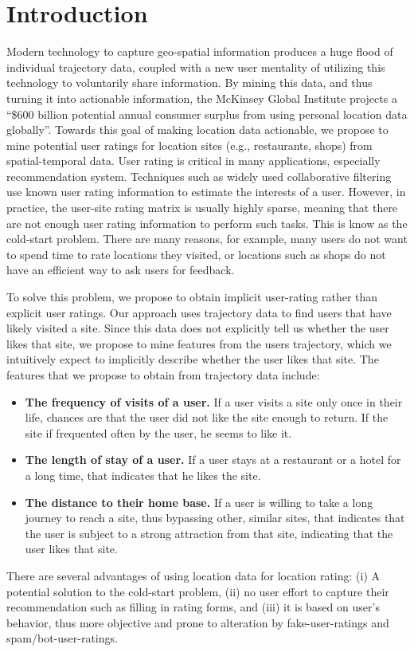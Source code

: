 \section{Introduction}\label{sec:intro}
Modern technology to capture geo-spatial information produces a
huge flood of individual trajectory data, coupled with a new
user mentality of utilizing this technology to voluntarily share information. 
By mining this data, and thus
turning it into actionable information, the McKinsey Global Institute \cite{manyika2011big} projects a ``\$600 billion
potential annual consumer surplus from using personal location data globally''. 
Towards this goal of making location data actionable, we propose to mine potential user ratings for location sites (e.g., restaurants, shops) from spatial-temporal data. User rating is critical in many applications, especially recommendation system. Techniques such as widely used collaborative filtering use known user rating information to estimate the interests of a user. However, in practice, the user-site rating matrix is usually highly sparse, meaning that there are not enough user rating information to perform such tasks. This is know as the cold-start problem. There are many reasons, for example, many users do not want to spend time to rate locations they visited, or locations such as shops do not have an efficient way to ask users for feedback.

To solve this problem, we propose to obtain implicit user-rating rather than explicit user ratings. Our approach uses trajectory data to find users that have likely visited a site. Since this data does not explicitly tell us whether the user likes that site, we propose to mine features from the users trajectory, which we intuitively expect to implicitly describe whether the user likes that site. The features that we propose to obtain from trajectory data include:
\begin{itemize}
\item {\bf The frequency of visits of a user.} If a user visits a site only once in their life, chances are that the user did not like the site enough to return. If the site if frequented often by the user, he seems to like it.
\item {\bf The length of stay of a user.} If a user stays at a restaurant or a hotel for a long time, that indicates that he likes the site.
\item {\bf The distance to their home base.} If a user is willing to take a long journey to reach a site, thus bypassing other, similar sites, that indicates that the user is subject to a strong attraction from that site, indicating that the user likes that site.  
\end{itemize}
There are several advantages of using location data for location rating: (i) A potential solution to the cold-start problem, (ii) no user effort to capture their recommendation such as filling in rating forms, and (iii) it is based on user's behavior, thus more objective and prone to alteration by fake-user-ratings and spam/bot-user-ratings.


